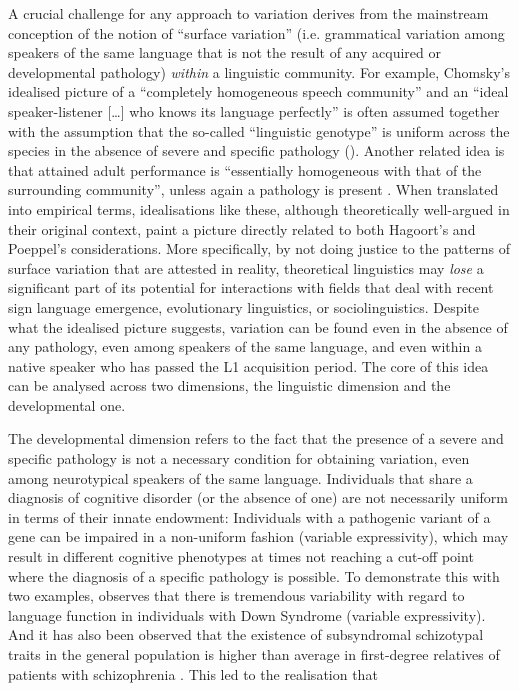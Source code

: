 \documentclass[output=paper]{langsci/langscibook}
\begin{document}
A crucial challenge for any approach to variation derives from the mainstream
conception of the notion of \enquote{surface variation} (i.e. grammatical variation
among speakers of the same language that is not the result of any acquired or
developmental pathology) \emph{within} a linguistic community. For example,
Chomsky’s idealised picture of a “completely homogeneous speech community” and
an “ideal speaker-listener […] who knows its language perfectly”
\citep[3]{Chomsky1965} is often assumed together with the assumption that the
so-called \enquote{linguistic genotype} is uniform across the species in the absence of
severe and specific pathology (\citealt{AndLigh2000}). Another
related idea is that attained adult performance is “essentially homogeneous
with that of the surrounding community”, unless again a pathology is present
\parencite[698]{AndLigh2000}. When translated into empirical terms,
idealisations like these, although theoretically well-argued in their original
context, paint a picture directly related to both Hagoort’s and Poeppel’s
considerations. More specifically, by not doing justice to the patterns of
surface variation that are attested in reality, theoretical linguistics may
\emph{lose} a significant part of its potential for interactions with fields
that deal with recent sign language emergence, evolutionary linguistics, or
sociolinguistics. Despite what the idealised picture suggests, variation can be
found even in the absence of any pathology, even among speakers of the same
language, and even within a native speaker who has passed the L1 acquisition
period. The core of this idea can be analysed across two dimensions, the
linguistic dimension and the developmental one.

The developmental dimension refers to the fact that the presence of a severe
and specific pathology is not a necessary condition for obtaining variation,
even among neurotypical speakers of the same language. Individuals that share a
diagnosis of cognitive disorder (or the absence of one) are not necessarily
uniform in terms of their innate endowment: Individuals with a pathogenic
variant of a gene can be impaired in a non-uniform fashion (variable
expressivity), which may result in different cognitive phenotypes at times not
reaching a cut-off point where the diagnosis of a specific pathology is
possible. To demonstrate this with two examples, \citet{Fowler1995} observes
that there is tremendous variability with regard to language function in
individuals with Down Syndrome (variable expressivity). And it has also been
observed that the existence of subsyndromal schizotypal traits in the general
population is higher than average in first-degree relatives of patients with
schizophrenia \citep{CalkinsEtAl2004}. This led to the realisation that
\end{document}
